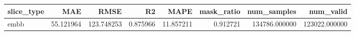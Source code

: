 \begin{tabular}{lrrrrrrr}
\toprule
slice_type & MAE & RMSE & R2 & MAPE & mask_ratio & num_samples & num_valid \\
\midrule
embb & 55.121964 & 123.748253 & 0.875966 & 11.857211 & 0.912721 & 134786.000000 & 123022.000000 \\
\bottomrule
\end{tabular}
